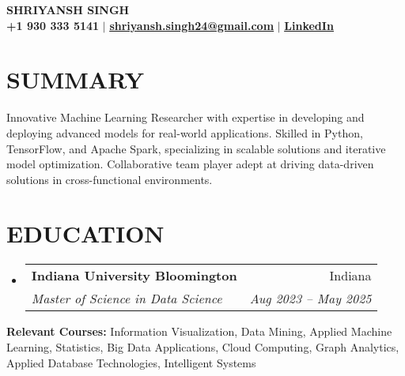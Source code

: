 \documentclass[letterpaper,11pt]{article}
\makeatletter
\newcommand{\resumeSubheading}[4]{
  \vspace{-1pt}\item
    \begin{tabular*}{0.97\textwidth}[t]{l@{\extracolsep{\fill}}r}
      \textbf{#1} & #2 \\
      \textit{\small#3} & \textit{\small #4} \\
    \end{tabular*}\vspace{-5pt}
}
\newcommand{\resumeSubHeadingListStart}{\begin{itemize}[leftmargin=0.15in, label={}]}
\newcommand{\resumeSubHeadingListEnd}{\end{itemize}}
\makeatother
\begin{document}
\begin{center}
    \textbf{\Huge \scshape SHRIYANSH SINGH} \\ \vspace{1pt}
    \small \textbf{+1 930 333 5141}  $|$ \href{mailto:shriyansh.singh24@gmail.com}{\textbf{\underline{shriyansh.singh24@gmail.com}}} $|$ 
    \href{https://www.linkedin.com/in/shriyansh-bir-singh}{\textbf{\underline{LinkedIn}}} 
\end{center}

\vspace{-10pt}

\section{\textbf{SUMMARY}}
Innovative Machine Learning Researcher with expertise in developing and deploying advanced models for real-world applications. Skilled in Python, TensorFlow, and Apache Spark, specializing in scalable solutions and iterative model optimization. Collaborative team player adept at driving data-driven solutions in cross-functional environments.

\section{\textbf{EDUCATION}}
  \resumeSubHeadingListStart
    \resumeSubheading
      {Indiana University Bloomington}{Indiana}
      {Master of Science in Data Science}{Aug 2023 – May 2025}
  \resumeSubHeadingListEnd
\vspace{-5pt}
\textbf{Relevant Courses:} Information Visualization, Data Mining, Applied Machine Learning, Statistics, Big Data Applications, Cloud Computing, Graph Analytics, Applied Database Technologies, Intelligent Systems


\end{document}
